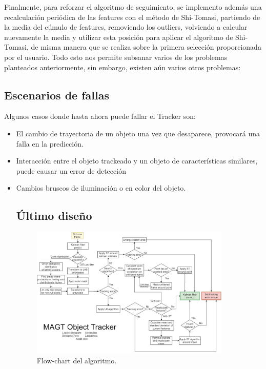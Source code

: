 Finalmente, para reforzar el algoritmo de seguimiento, se implemento además una recalculación periódica de las features con el método de Shi-Tomasi, partiendo de la media del cúmulo de features, removiendo los outliers, volviendo a calcular nuevamente la media y utilizar esta posición para aplicar el algoritmo de Shi-Tomasi, de misma manera que se realiza sobre la primera selección proporcionada por el usuario. Todo esto nos permite subsanar varios de los problemas planteados anteriormente, sin embargo, existen aún varios otros problemas:

\subsection{Escenarios de fallas}
Algunos casos donde hasta ahora puede fallar el Tracker son:
\begin{itemize}
\item El cambio de trayectoria de un objeto una vez que desaparece, provocará una falla en la predicción.
\item Interacción entre el objeto trackeado y un objeto de características similares, puede causar un error de detección
\item Cambios bruscos de iluminación o en color del objeto.


\subsection{Último diseño}

\begin{figure}
\centering
	\includegraphics[width=0.9\textwidth]{../flowchart.jpg}
	\caption{Flow-chart del algoritmo.}
	\label{fig:Flowchart}
\end{figure}


\end{itemize}
